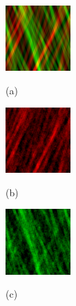 \documentclass{article}
\begin{document}
\begin{figure}[t]
\begin{minipage}[b]{0.32\linewidth}
  \centering
  \centerline{\includegraphics[width=2.5cm]{sources}}
  \centerline{(a)}
\end{minipage}
\begin{minipage}[b]{0.32\linewidth}
  \centering
  \centerline{\includegraphics[width=2.5cm]{recon_focus1}}
  \centerline{(b)}
\end{minipage}
\begin{minipage}[b]{0.32\linewidth}
  \centering
  \centerline{\includegraphics[width=2.5cm]{recon_focus2}}
  \centerline{(c)}
\end{minipage}


\end{figure}
\end{document}

